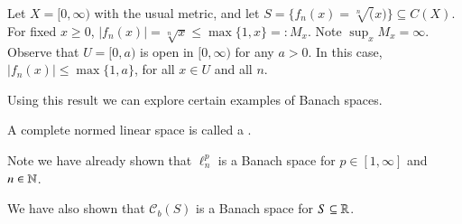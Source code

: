 \begin{example}
    Let $X = [0,\infty)$ with the usual metric, and let $S = \{f_n(x)=\sqrt[n](x)\}\subseteq C(X)$.  For fixed $x \geq 0$, $|f_n(x)| = \sqrt[n]{x} \leq \max\{1,x\} =: M_x$. Note $\sup_xM_x = \infty$. Observe that $U = [0,a)$ is open in $[0,\infty)$ for any $a > 0$. In this case, $|f_n(x)| \leq \max\{1,a\}$, for all $x \in U$ and all $n$.
\end{example}

Using this result we can explore certain examples of Banach spaces.

\begin{definition}
    A complete normed linear space is called a .
\end{definition}

\begin{example}
    Note we have already shown that $\ell_n^p$ is a Banach space for $p \in [1,\infty]$ and $n \in \mathbb N$. 
\end{example}

\begin{example}
    We have also shown that $\mathcal{C}_b(S)$ is a Banach space for $S \subseteq \mathbb R$.
\end{example}


